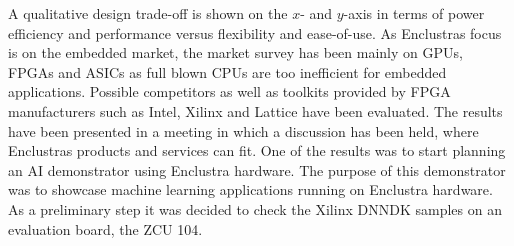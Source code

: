 A qualitative design trade-off is shown on the $x$- and $y$-axis in terms of power efficiency and performance versus flexibility and ease-of-use. As Enclustras focus is on the embedded market, the market survey has been mainly on \acp{GPU}, \acp{FPGA} and \acp{ASIC} as full blown \acp{CPU} are too inefficient for embedded applications. Possible competitors as well as toolkits provided by \ac{FPGA} manufacturers such as Intel, Xilinx and Lattice have been evaluated. The results have been presented in a meeting in which a discussion has been held, where Enclustras products and services can fit. One of the results was to start planning an \ac{AI} demonstrator using Enclustra hardware. The purpose of this demonstrator was to showcase machine learning applications running on Enclustra hardware. As a preliminary step it was decided to check the Xilinx \ac{DNNDK} samples on an evaluation board, the ZCU 104.